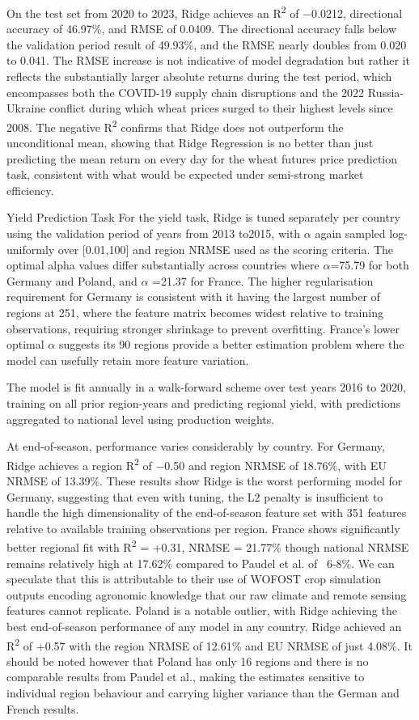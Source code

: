 \documentclass[pdflatex,sn-mathphys-num, oneside]{sn-jnl}%
\theoremstyle{thmstyleone}%
\theoremstyle{thmstyletwo}%
\theoremstyle{thmstylethree}%
\begin{document}
On the test set from 2020 to 2023, Ridge achieves an R\textsuperscript{2} of −0.0212, directional accuracy of 46.97\%, and RMSE of 0.0409. The directional accuracy falls below the validation period result of 49.93\%, and the RMSE nearly doubles from 0.020 to 0.041. The RMSE increase is not indicative of model degradation but rather it reflects the substantially larger absolute returns during the test period, which encompasses both the COVID-19 supply chain disruptions and the 2022 Russia-Ukraine conflict during which wheat prices surged to their highest levels since 2008. The negative R\textsuperscript{2} confirms that Ridge does not outperform the unconditional mean, showing that Ridge Regression is no better than just predicting the mean return on every day for the wheat futures price prediction task, consistent with what would be expected under semi-strong market efficiency.

Yield Prediction Task
For the yield task, Ridge is tuned separately per country using the validation period of years from 2013 to2015, with $\alpha$ again sampled log-uniformly over [0.01,100] and region NRMSE used as the scoring criteria. The optimal alpha values differ substantially across countries where $\alpha$=75.79 for both Germany and Poland, and $\alpha$ =21.37 for France. The higher regularisation requirement for Germany is consistent with it having the largest number of regions at 251, where the feature matrix becomes widest relative to training observations, requiring stronger shrinkage to prevent overfitting. France's lower optimal $\alpha$ suggests its 90 regions provide a better estimation problem where the model can usefully retain more feature variation.

The model is fit annually in a walk-forward scheme over test years 2016 to 2020, training on all prior region-years and predicting regional yield, with predictions aggregated to national level using production weights.

At end-of-season, performance varies considerably by country. For Germany, Ridge achieves a region R\textsuperscript{2} of −0.50 and region NRMSE of 18.76\%, with EU NRMSE of 13.39\%. These results show Ridge is the worst performing model for Germany, suggesting that even with tuning, the L2 penalty is insufficient to handle the high dimensionality of the end-of-season feature set with 351 features relative to available training observations per region. France shows significantly better regional fit with R\textsuperscript{2} = +0.31, NRMSE = 21.77\% though national NRMSE remains relatively high at 17.62\% compared to Paudel et al.\cite{bib16} of ~6-8\%. We can speculate that this is attributable to their use of WOFOST crop simulation outputs encoding agronomic knowledge that our raw climate and remote sensing features cannot replicate. Poland is a notable outlier, with Ridge achieving the best end-of-season performance of any model in any country. Ridge achieved an  R\textsuperscript{2} of +0.57 with the region NRMSE of 12.61\% and EU NRMSE of just 4.08\%. It should be noted however that Poland has only 16 regions and there is no comparable results from Paudel et al.\cite{bib16}, making the estimates sensitive to individual region behaviour and carrying higher variance than the German and French results. 
\end{document}
